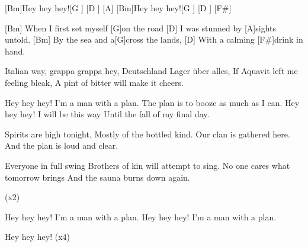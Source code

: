 

\begin{guitar}
	
	[Bm]Hey hey hey![G ] [D ] [A]{}
	[Bm]Hey hey hey![G ] [D ] [F#]{}
	
	[Bm] When I first set myself [G]on the road
	[D] I was stunned by [A]sights untold.
	[Bm] By the sea and a[G]cross the lands,
	[D] With a calming [F#]drink in hand.
	
	Italian way, grappa grappa hey,
	Deutschland Lager über alles,
	If Aquavit left me feeling bleak,
	A pint of bitter will make it cheers.
	
	Hey hey hey! I'm a man with a plan.
	The plan is to booze as much as I can.
	Hey hey hey! I will be this way
	Until the fall of my final day.
	
	
	Spirits are high tonight,
	Mostly of the bottled kind.
	Our clan is gathered here.
	And the plan is loud and clear.
	
	Everyone in full swing
	Brothers of kin will attempt to sing.
	No one cares what tomorrow brings
	And the sauna burns down again.
	
	  (x2)
	
	Hey hey hey! I'm a man with a plan.
	Hey hey hey! I'm a man with a plan.
	
	Hey hey hey! (x4)
\end{guitar}